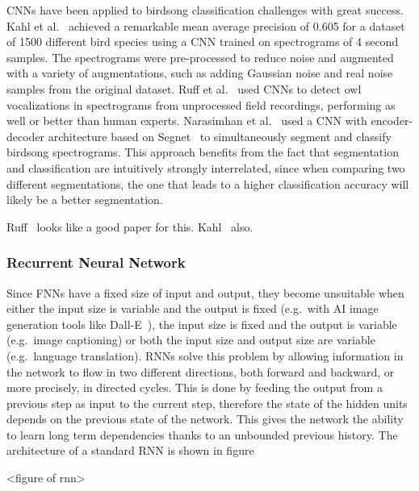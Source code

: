 CNNs have been applied to birdsong classification challenges with great success.
Kahl et al.~\cite{kahl2017large} achieved a remarkable mean average precision of
0.605 for a dataset of 1500 different bird species using a CNN trained on
spectrograms of 4 second samples. The spectrograms were pre-processed to reduce
noise and augmented with a variety of augmentations, such as adding Gaussian
noise and real noise samples from the original dataset. Ruff et
al.~\cite{ruff2020automated} used CNNs to detect owl vocalizations in
spectrograms from unprocessed field recordings, performing as well or better
than human experts. Narasimhan et al.~\cite{narasimhan2017simultaneous} used a
CNN with encoder-decoder architecture based on
Segnet~\cite{badrinarayanan2017segnet} to simultaneously segment and classify
birdsong spectrograms. This approach benefits from the fact that segmentation
and classification are intuitively strongly interrelated, since when comparing
two different segmentations, the one that leads to a higher classification
accuracy will likely be a better segmentation.

Ruff~\cite{ruff2020automated} looks like a good paper for this.
Kahl~\cite{kahl2017large} also.

\subsubsection{Recurrent Neural Network}

Since FNNs have a fixed size of input and output, they become unsuitable when
either the input size is variable and the output is fixed (e.g.\ with AI image
generation tools like Dall-E~\cite{ramesh2021zero}), the input size is fixed and
the output is variable (e.g.\ image captioning) or both the input size and
output size are variable (e.g.\ language translation). RNNs solve this problem
by allowing information in the network to flow in two different directions, both
forward and backward, or more precisely, in directed cycles. This is done by
feeding the output from a previous step as input to the current step, therefore
the state of the hidden units depends on the previous state of the network. This
gives the network the ability to learn long term dependencies thanks to an
unbounded previous history. The architecture of a standard RNN is shown in
figure

<figure of rnn>

